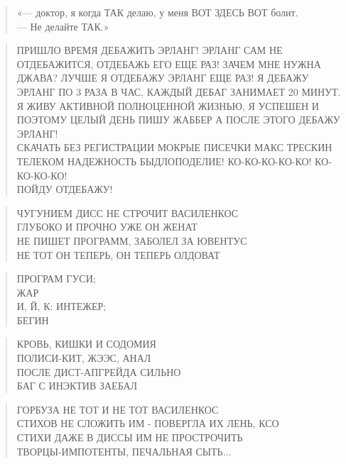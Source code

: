 \poemtitle{***}
\begin{verse}
«— доктор, я когда ТАК делаю, у меня ВОТ ЗДЕСЬ ВОТ болит.\\
— Не делайте ТАК.»
\end{verse}

\poemtitle{***}
\begin{verse}
ПРИШЛО ВРЕМЯ ДЕБАЖИТЬ ЭРЛАНГ! ЭРЛАНГ САМ НЕ ОТДЕБАЖИТСЯ, ОТДЕБАЖЬ ЕГО ЕЩЕ РАЗ! ЗАЧЕМ МНЕ НУЖНА ДЖАВА? ЛУЧШЕ Я ОТДЕБАЖУ ЭРЛАНГ ЕЩЕ РАЗ! Я ДЕБАЖУ ЭРЛАНГ ПО 3 РАЗА В ЧАС, КАЖДЫЙ ДЕБАГ ЗАНИМАЕТ 20 МИНУТ. Я ЖИВУ АКТИВНОЙ ПОЛНОЦЕННОЙ ЖИЗНЬЮ, Я УСПЕШЕН И ПОЭТОМУ ЦЕЛЫЙ ДЕНЬ ПИШУ ЖАББЕР А ПОСЛЕ ЭТОГО ДЕБАЖУ ЭРЛАНГ!\\
СКАЧАТЬ БЕЗ РЕГИСТРАЦИИ МОКРЫЕ ПИСЕЧКИ МАКС ТРЕСКИН ТЕЛЕКОМ НАДЕЖНОСТЬ БЫДЛОПОДЕЛИЕ! КО-КО-КО-КО-КО! КО-КО-КО-КО!\\
ПОЙДУ ОТДЕБАЖУ!
\end{verse}

\poemtitle{***}
\begin{verse}
ЧУГУНИЕМ ДИСС НЕ СТРОЧИТ ВАСИЛЕНКОС\\
ГЛУБОКО И ПРОЧНО УЖЕ ОН ЖЕНАТ\\
НЕ ПИШЕТ ПРОГРАММ, ЗАБОЛЕЛ ЗА ЮВЕНТУС\\
НЕ ТОТ ОН ТЕПЕРЬ, ОН ТЕПЕРЬ ОЛДОВАТ
\end{verse}

\poemtitle{***}
\begin{verse}
ПРОГРАМ ГУСИ;\\
ЖАР\\
  И, Й, К: ИНТЕЖЕР;\\
БЕГИН
\end{verse}

\poemtitle{***}
\begin{verse}
КРОВЬ, КИШКИ И СОДОМИЯ\\
ПОЛИСИ-КИТ, ЖЭЭС, АНАЛ\\
ПОСЛЕ ДИСТ-АПГРЕЙДА СИЛЬНО\\
БАГ С  ИНЭКТИВ ЗАЕБАЛ
\end{verse}

\poemtitle{***}
\begin{verse}
ГОРБУЗА НЕ ТОТ И НЕ ТОТ ВАСИЛЕНКОС\\
СТИХОВ НЕ СЛОЖИТЬ ИМ - ПОВЕРГЛА ИХ ЛЕНЬ, КСО\\
СТИХИ ДАЖЕ В ДИССЫ ИМ НЕ ПРОСТРОЧИТЬ\\
ТВОРЦЫ-ИМПОТЕНТЫ, ПЕЧАЛЬНАЯ СЫТЬ...
\end{verse}

